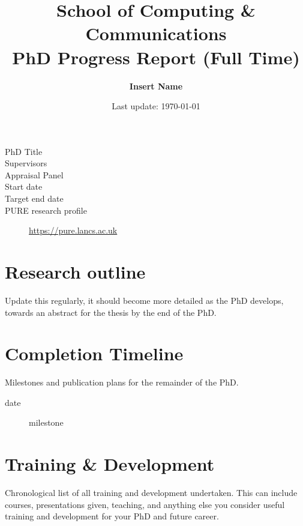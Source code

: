 \documentclass[12pt,a4paper]{article}
\author{\LARGE \textbf{Insert Name}} %
\title{School of Computing \& Communications\\PhD Progress Report (Full Time)}
\date{Last update: \today}
\begin{document}
\maketitle

\begin{description}
	\item[PhD Title] %
	\item[Supervisors] %
	\item[Appraisal Panel] %
	\item[Start date] %
	\item[Target end date] %
	\item[PURE research profile] \url{https://pure.lancs.ac.uk} %
\end{description}

\section{Research outline}
Update this regularly, it should become more detailed as the PhD develops, towards an abstract for the thesis by the end of the PhD.


\section{Completion Timeline}
Milestones and publication plans for the remainder of the PhD.


\begin{description}
	\item[date] milestone
\end{description}

\section{Training \& Development}
Chronological list of all training and development undertaken. This can include courses, presentations given, teaching, and anything else you consider useful training and development for your PhD and future career.
\end{document}
